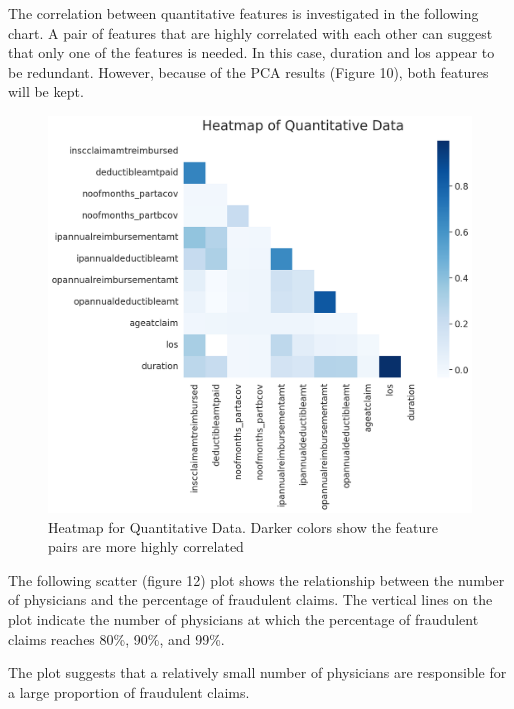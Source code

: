 \documentclass[twoside,11pt]{article}
\begin{document}
The correlation between quantitative features is investigated in the following
chart. A pair of features that are highly correlated with each other can suggest
that only one of the features is needed. In this case, duration and los appear
to be redundant. However, because of the PCA results (Figure 10), both features will be kept.
\begin{figure}[!htbp]
  \centering
  \includegraphics[width=\textwidth]{./img/heatmap.png}
  \caption{Heatmap for Quantitative Data. Darker colors show
  the feature pairs are more highly correlated}
\end{figure}
\newpage
The following scatter (figure 12) plot shows the relationship between the 
number of physicians and the percentage of fraudulent claims. 
The vertical lines on the plot indicate the number of physicians at 
which the percentage of fraudulent claims reaches 80\%, 90\%, and 99\%.

The plot suggests that a relatively small number of
physicians are responsible for a large proportion of fraudulent claims. 
\end{document}
